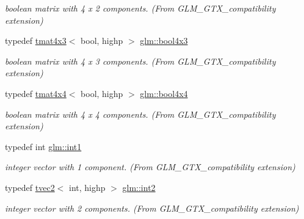 \begin{DoxyCompactItemize}
\begin{DoxyCompactList}\small\item\em boolean matrix with 4 x 2 components. (From G\+L\+M\+\_\+\+G\+T\+X\+\_\+compatibility extension) \end{DoxyCompactList}\item 
\mbox{\label{group__gtx__compatibility_gafd85fa864c89a6b1b4887d2790132c5c}} 
typedef \hyperlink{structglm_1_1tmat4x3}{tmat4x3}$<$ bool, highp $>$ \hyperlink{group__gtx__compatibility_gafd85fa864c89a6b1b4887d2790132c5c}{glm\+::bool4x3}
\begin{DoxyCompactList}\small\item\em boolean matrix with 4 x 3 components. (From G\+L\+M\+\_\+\+G\+T\+X\+\_\+compatibility extension) \end{DoxyCompactList}\item 
\mbox{\label{group__gtx__compatibility_gafd4a5a69fab4d76f91ee75684f3bf2f1}} 
typedef \hyperlink{structglm_1_1tmat4x4}{tmat4x4}$<$ bool, highp $>$ \hyperlink{group__gtx__compatibility_gafd4a5a69fab4d76f91ee75684f3bf2f1}{glm\+::bool4x4}
\begin{DoxyCompactList}\small\item\em boolean matrix with 4 x 4 components. (From G\+L\+M\+\_\+\+G\+T\+X\+\_\+compatibility extension) \end{DoxyCompactList}\item 
\mbox{\label{group__gtx__compatibility_gaba41d7803e4b24c17656d74377b88286}} 
typedef int \hyperlink{group__gtx__compatibility_gaba41d7803e4b24c17656d74377b88286}{glm\+::int1}
\begin{DoxyCompactList}\small\item\em integer vector with 1 component. (From G\+L\+M\+\_\+\+G\+T\+X\+\_\+compatibility extension) \end{DoxyCompactList}\item 
\mbox{\label{group__gtx__compatibility_ga89f98d125d3e73b50e34bc35d93796f1}} 
typedef \hyperlink{structglm_1_1tvec2}{tvec2}$<$ int, highp $>$ \hyperlink{group__gtx__compatibility_ga89f98d125d3e73b50e34bc35d93796f1}{glm\+::int2}
\begin{DoxyCompactList}\small\item\em integer vector with 2 components. (From G\+L\+M\+\_\+\+G\+T\+X\+\_\+compatibility extension) \end{DoxyCompactList}\item 

\end{DoxyCompactItemize}
